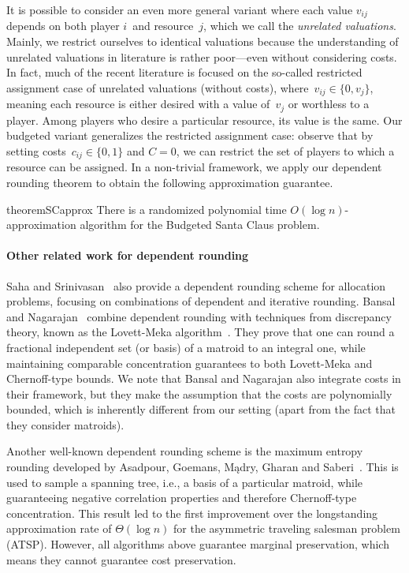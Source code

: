 \documentclass[a4paper,USenglish,cleveref,thm-restate]{lipics-v2021}
\begin{document}
It is possible to consider an even more general variant
where each value $v_{ij}$ depends on both player $i$~and
resource~$j$, which we call the \emph{unrelated valuations}.
Mainly, we restrict ourselves to identical valuations because
the understanding of unrelated valuations in literature is
rather poor---even without considering costs.
In fact, much of the recent literature is focused on the so-called
restricted assignment case
of unrelated valuations (without costs),
where~$v_{ij}\in\{0, v_j\}$,
meaning each resource is either desired with a value of~$v_j$ or worthless to a player.
Among players who desire a particular resource,
its value is the same. Our budgeted variant generalizes the
restricted assignment case: observe that by setting costs~$c_{ij}\in\{0,1\}$ and $C = 0$, we can restrict
the set of players to which a resource can be assigned.
In a non-trivial framework, we apply our dependent rounding theorem
to obtain the following approximation guarantee.
\begin{restatable}{theorem}{SCapprox}
    There is a randomized polynomial time $O(\log n)$-approximation algorithm for the Budgeted Santa Claus problem.
\end{restatable}

\paragraph*{Other related work for dependent rounding}
Saha and Srinivasan~\cite{SahaS18} also provide a
dependent rounding scheme for allocation problems,
focusing on combinations of dependent
and iterative rounding.
Bansal and Nagarajan~\cite{BansalN16}
combine dependent rounding with techniques from discrepancy theory, known as the Lovett-Meka algorithm~\cite{LovettM15}. They
prove that one can round a fractional independent
set (or basis) of a matroid to an integral one,
while maintaining comparable concentration guarantees to both Lovett-Meka and Chernoff-type bounds.
We note that Bansal and Nagarajan also integrate
costs in their framework, but they make the
assumption that the costs are polynomially bounded,
which is inherently different from our setting (apart from the fact that they consider matroids).

Another well-known dependent rounding scheme is the maximum entropy
rounding developed by Asadpour, Goemans, M{\k{a}}dry, Gharan and Saberi~\cite{AsadpourGMGS17}.
This is used to sample
a spanning tree, i.e., a basis of a particular matroid,
while guaranteeing negative correlation properties and therefore Chernoff-type concentration.
This result led to the first improvement over the longstanding
approximation rate of $\Theta(\log n)$ for the asymmetric
traveling salesman problem (ATSP).
However, all algorithms above guarantee marginal preservation, which means they
cannot guarantee cost preservation.
\end{document}
